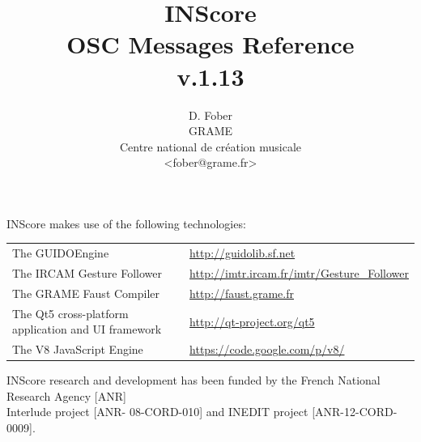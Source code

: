 \documentclass[a4paper,twoside]{report}
\begin{document}
\title{INScore \\ OSC Messages Reference \\v.1.13}

\author{D. Fober\\ GRAME\\ Centre national de cr\'eation musicale\\
{\small <fober@grame.fr>} \\
}

\maketitle

\vspace*{17cm}
 
{\small INScore makes use of the following technologies:}
\begin{table}[h]
\begin{tabular}{ll}
{\small The GUIDOEngine}  					& {\small \url{http://guidolib.sf.net}} \\
{\small The IRCAM Gesture Follower} 		& {\small \url{http://imtr.ircam.fr/imtr/Gesture_Follower}} \\
{\small The GRAME Faust Compiler} 		& {\small \url{http://faust.grame.fr}} \\
{\small The Qt5 cross-platform application and UI framework} & {\small \url{http://qt-project.org/qt5}} \\
{\small The V8 JavaScript Engine} 				& {\small \url{https://code.google.com/p/v8/}}
\end{tabular}
\end{table}%

{\small INScore research and development has been funded by the French National Research Agency [ANR]\\ Interlude project [ANR- 08-CORD-010] and INEDIT project [ANR-12-CORD-0009].}
  

\pagestyle{empty}
\cleardoublepage
\tableofcontents

\vspace*{9.5cm}

\noindent\hrulefill\par
\vspace*{5mm}
\noindent{}
\thispagestyle{empty}
\pagestyle{plain}
\end{document}
